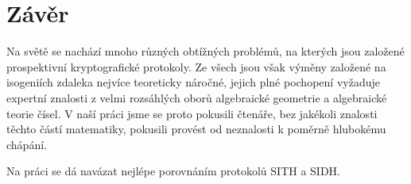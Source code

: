 \documentclass[12pt]{report}
\begin{document}
\chapter*{Závěr}

Na světě se nachází mnoho různých obtížných problémů, na kterých jsou založené prospektivní kryptografické protokoly. Ze všech jsou však výměny založené na isogeniích zdaleka nejvíce teoreticky náročné, jejich plné pochopení vyžaduje expertní znalosti z velmi rozsáhlých oborů algebraické geometrie a algebraické teorie čísel. V naší práci jsme se proto pokusili čtenáře, bez jakékoli znalosti těchto částí matematiky, pokusili provést od neznalosti k poměrně hlubokému chápání.

Na práci se dá navázat nejlépe porovnáním protokolů SITH a SIDH.



\end{document}
